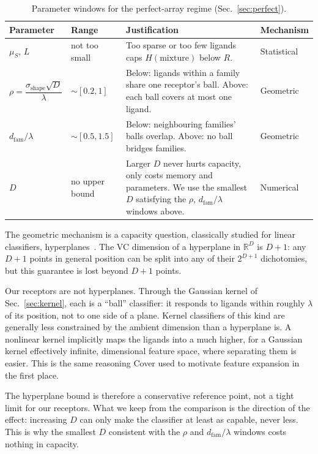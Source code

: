 \documentclass[aps,pre,superscriptaddress,floatfix,longbibliography]{revtex4-2}
\begin{document}
\begin{table}[t]
\centering
\begin{tabular}{p{2.2cm}p{2.6cm}p{5.2cm}p{2.0cm}}
Parameter & Range & Justification & Mechanism \\
\hline
$\mu_S,\,L$ & not too small & Too sparse or too few ligands caps
$H(\text{mixture})$ below $R$. & Statistical \\[6pt]
$\rho=\dfrac{\sigma_\text{shape}\sqrt{D}}{\lambda}$ & $\sim[0.2,1]$ &
Below: ligands within a family share one receptor's ball. Above: each ball
covers at most one ligand. & Geometric \\[6pt]
$d_\text{fam}/\lambda$ & $\sim[0.5,1.5]$ & Below: neighbouring families'
balls overlap. Above: no ball bridges families. & Geometric \\[6pt]
$D$ & no upper bound & Larger $D$ never hurts capacity, only costs memory
and parameters. We use the smallest $D$ satisfying the $\rho$,
$d_\text{fam}/\lambda$ windows above. & Numerical \\
\end{tabular}
\caption{Parameter windows for the perfect-array regime
(Sec.~\ref{sec:perfect}).}
\label{tab:param_windows}
\end{table}

The geometric mechanism is a capacity question, classically studied for
linear classifiers, hyperplanes~\cite{cover_geometrical_1965}. The VC
dimension of a hyperplane in $\mathbb{R}^D$ is $D+1$: any $D+1$ points in
general position can be split into any of their $2^{D+1}$ dichotomies, but
this guarantee is lost beyond $D+1$ points.

Our receptors are not hyperplanes. Through the Gaussian kernel of
Sec.~\ref{sec:kernel}, each is a ``ball'' classifier: it responds to
ligands within roughly $\lambda$ of its position, not to one side of a
plane. Kernel classifiers of this kind are generally less constrained by
the ambient dimension than a hyperplane is. A nonlinear kernel implicitly
maps the ligands into a much higher, for a Gaussian kernel effectively
infinite, dimensional feature space, where separating them is easier. This
is the same reasoning Cover used to motivate feature expansion in the
first place.

The hyperplane bound is therefore a conservative reference point, not a
tight limit for our receptors. What we keep from the comparison is the
direction of the effect: increasing $D$ can only make the classifier at
least as capable, never less. This is why the smallest $D$ consistent with
the $\rho$ and $d_\text{fam}/\lambda$ windows costs nothing in capacity.
\end{document}
